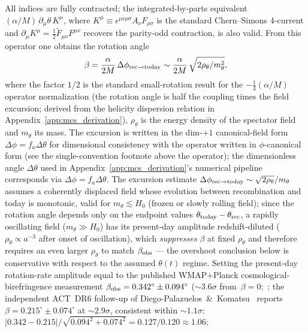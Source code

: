 \documentclass[aps,prd,twocolumn,superscriptaddress,showpacs,preprintnumbers,nofootinbib,longbibliography,floatfix]{revtex4-2}
\begin{document}
All indices are fully contracted; the integrated-by-parts equivalent $(\alpha/M)\,\partial_\mu\theta\, K^\mu$, where $K^\mu \equiv \epsilon^{\mu\nu\rho\sigma} A_\nu F_{\rho\sigma}$ is the standard Chern--Simons 4-current and $\partial_\mu K^\mu = \tfrac{1}{2}\tilde F_{\mu\nu}F^{\mu\nu}$ recovers the parity-odd contraction, is also valid. From this operator one obtains the rotation angle
\begin{equation}
\beta = \frac{\alpha}{2M}\,\Delta\phi_{\rm rec\to today}
\sim \frac{\alpha}{2M}\,\sqrt{2\rho_\theta/m_\theta^2},
\label{eq:beta_bound}
\end{equation}
where the factor $1/2$ is the standard small-rotation result for the
$-\tfrac{1}{4}(\alpha/M)$ operator normalization (the rotation angle is
half the coupling times the field excursion; derived from the helicity
dispersion relation in Appendix~\ref{app:mcs_derivation}), $\rho_\theta$ is the
energy density of the spectator field and $m_\theta$ its mass. The
excursion is written in the dim-$+1$ canonical-field form
$\Delta\phi=f_a\Delta\theta$ for dimensional consistency with the
operator written in $\phi$-canonical form (see the
single-convention footnote above the operator); the dimensionless
angle $\Delta\theta$ used in Appendix~\ref{app:mcs_derivation}'s
numerical pipeline corresponds via $\Delta\phi=f_a\Delta\theta$. The
excursion estimate $\Delta\phi_{\rm rec\to today} \sim
\sqrt{2\rho_\theta}/m_\theta$ assumes a coherently displaced field whose
evolution between recombination and today is monotonic, valid for
$m_\theta \lesssim H_0$ (frozen or slowly rolling field); since the
rotation angle depends only on the endpoint values
$\theta_{\rm today}-\theta_{\rm rec}$, a rapidly oscillating field
($m_\theta \gg H_0$) has its present-day amplitude redshift-diluted
($\rho_\theta \propto a^{-3}$ after onset of oscillation), which
\emph{suppresses} $\beta$ at fixed $\rho_\theta$ and therefore requires
an even larger $\rho_\theta$ to match $\beta_{\rm obs}$ --- the
overshoot conclusion below is conservative with respect to the assumed
$\theta(t)$ regime. Setting the present-day rotation-rate amplitude
equal to the published WMAP$+$Planck cosmological-birefringence
measurement $\beta_{\rm obs} = 0.342^\circ \pm 0.094^\circ$
($\sim\!3.6\sigma$ from~$\beta=0$;~\cite{Minami2020,Eskilt2022}; the
independent ACT~DR6 follow-up of Diego-Palazuelos~\&~Komatsu~\cite{DiegoPalazuelos2025}
reports $\beta = 0.215^\circ \pm 0.074^\circ$ at $\sim\!2.9\sigma$, consistent
within $\sim\!1.1\sigma$:
$\bigl|0.342-0.215\bigr|/\sqrt{0.094^2+0.074^2} = 0.127/0.120 \approx 1.06$;
\end{document}
